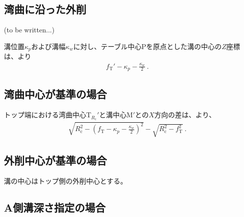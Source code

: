 \subsection{湾曲に沿った外削\TBW}
(to be written...)


\clearpage
溝位置$\kappa_p$および溝幅$\kappa_w$に対し、テーブル中心Pを原点とした溝の中心の$Z$座標は、より
\begin{align*}
  f_\mathrm T'-\kappa_p-\frac{\kappa_w}2\ .
\end{align*}


\subsection{湾曲中心が基準の場合}
トップ端における湾曲中心T$_{R_\mathrm c}'$と溝中心M$'$との$X$方向の差は、より、
\begin{align*}
  \sqrt{R_\mathrm c^2-\left(f_\mathrm T-\kappa_p-\frac{\kappa_w}2\right)^{\!2}}
  -\sqrt{R_\mathrm c^2-f_\mathrm T^2}\ .
\end{align*}


\subsection{外削中心が基準の場合}
溝の中心はトップ側の外削中心とする。


\subsection{A側溝深さ指定の場合}
